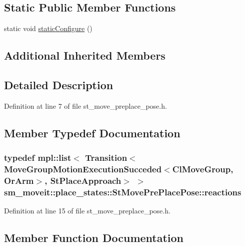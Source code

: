 \subsection*{Static Public Member Functions}
\begin{DoxyCompactItemize}
\item 
static void \hyperlink{structsm__moveit_1_1place__states_1_1StMovePrePlacePose_a3dc8d058fe81bb5fe5db216d9ee506ba}{static\+Configure} ()
\end{DoxyCompactItemize}
\subsection*{Additional Inherited Members}


\subsection{Detailed Description}


Definition at line 7 of file st\+\_\+move\+\_\+preplace\+\_\+pose.\+h.



\subsection{Member Typedef Documentation}
\subsubsection[{\texorpdfstring{reactions}{reactions}}]{\setlength{\rightskip}{0pt plus 5cm}typedef mpl\+::list$<$ Transition$<${\bf Move\+Group\+Motion\+Execution\+Succeded}$<${\bf Cl\+Move\+Group}, {\bf Or\+Arm}$>$, {\bf St\+Place\+Approach}$>$ $>$ {\bf sm\+\_\+moveit\+::place\+\_\+states\+::\+St\+Move\+Pre\+Place\+Pose\+::reactions}}\hypertarget{structsm__moveit_1_1place__states_1_1StMovePrePlacePose_ae4526e251f44c3aa5ef2606d0a1e273d}{}\label{structsm__moveit_1_1place__states_1_1StMovePrePlacePose_ae4526e251f44c3aa5ef2606d0a1e273d}


Definition at line 15 of file st\+\_\+move\+\_\+preplace\+\_\+pose.\+h.



\subsection{Member Function Documentation}
